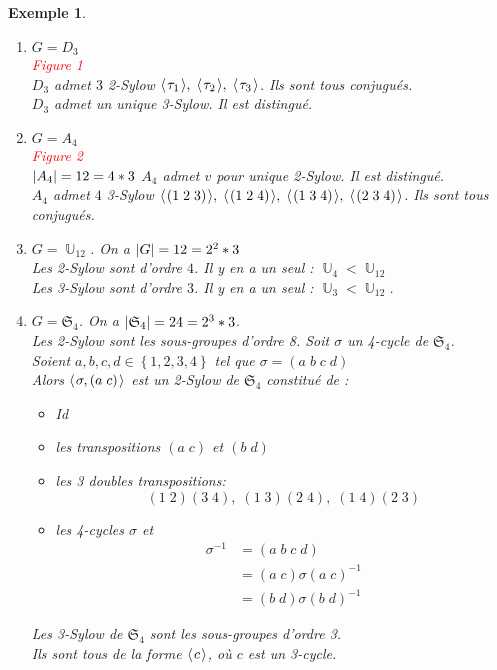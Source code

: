 \documentclass[a4paper, oneside]{report}
\theoremstyle{break}
\newtheorem{exemple}[thm]{Exemple}
\newcommand{\red}[1]{\textcolor{red}{#1}}
\DeclareMathOperator{\U}{\mathbb{U}}
\DeclarePairedDelimiter\ens{\left\{ }{\right\} }%
\DeclarePairedDelimiter\abs{\lvert}{\rvert}%
\renewcommand{\ens}[1]{\left\{ #1 \right\} }%
\newcommand{\pro}[1]{\langle\hspace{0.1em}#1\hspace{0.1em}\rangle}
\begin{document}
\begin{exemple}
\begin{enumerate}
\item $G = D_3$\\

\red{Figure 1}\\

$D_3$ admet $3$ 2-Sylow $\pro{\tau_1}, \; \pro{\tau_2}, \; \pro{\tau_3}$. Ils sont tous conjugués.\\
$D_3$ admet un unique 3-Sylow. Il est distingué.\\

\item $G = A_4$\\

\red{Figure 2}\\

$\abs{A_4} = 12 = 4 * 3$
$A_4$ admet $v$ pour unique 2-Sylow. Il est distingué.\\
$A_4$ admet $4$ 3-Sylow	$\pro{(1 \; 2 \; 3)}, \; \pro{(1 \; 2 \; 4)}, \; \pro{(1 \; 3 \; 4)}, \; \pro{(2 \; 3 \; 4)}$. Ils sont tous conjugués.\\

\item $G = \U_{12}$. On a $\abs{G} = 12 = 2^2 * 3$\\
Les 2-Sylow sont d'ordre $4$. Il y en a un seul : $\U_4 < \U_{12}$\\
Les 3-Sylow sont d'ordre $3$. Il y en a un seul : $\U_3 < \U_{12}$.\\

\item $G = \mathfrak{S}_4$. On a $\abs{\mathfrak{S}_4} = 24 = 2^3 * 3$.\\
Les 2-Sylow sont les sous-groupes d'ordre 8. Soit $\sigma$ un 4-cycle de $\mathfrak{S}_4$.\\
Soient $a, b, c, d \in \ens{1, 2, 3, 4}$ tel que $\sigma = (a \; b \; c \; d)$\\
Alors $\pro{\sigma, (a \; c)}$ est un 2-Sylow de $\mathfrak{S}_4$ constitué de :
\begin{itemize}[label=$\bullet$]
\item Id

\item les transpositions $(a \; c)$ et $(b \; d)$

\item les 3 doubles transpositions:
\[
(1 \; 2)(3 \; 4), \; (1 \; 3)(2 \; 4), \; (1 \; 4)(2 \; 3)
\]

\item les 4-cycles $\sigma$ et 
\begin{align*}
\sigma^{-1} &= (a \; b \; c \; d)
\\
&= (a \; c) \sigma (a \; c)^{-1}
\\
&= (b \; d) \sigma (b \; d)^{-1}
\end{align*}
\end{itemize}
Les 3-Sylow de $\mathfrak{S}_4$ sont les sous-groupes d'ordre 3.\\
Ils sont tous de la forme $\pro{c}$, où $c$ est un 3-cycle.\\


\end{enumerate}
\end{exemple}
\end{document}
